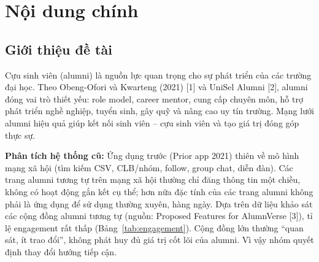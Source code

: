 \documentclass[12pt,a4paper]{article}
\begin{document}
\pagestyle{fancy}
\fancyhf{}
\rfoot{\textbf{\thepage}}

\setcounter{section}{1}
\section{Nội dung chính}
\subsection{Giới thiệu đề tài}

Cựu sinh viên (alumni) là nguồn lực quan trọng cho sự phát triển của các trường đại học. Theo Obeng-Ofori và Kwarteng (2021) [1] và UniSel Alumni [2], alumni đóng vai trò thiết yếu: role model, career mentor, cung cấp chuyên môn, hỗ trợ phát triển nghề nghiệp, tuyển sinh, gây quỹ và nâng cao uy tín trường. Mạng lưới alumni hiệu quả giúp kết nối sinh viên -- cựu sinh viên và tạo giá trị đóng góp thực sự.

\textbf{Phân tích hệ thống cũ:} Ứng dụng trước (Prior app 2021) thiên về mô hình mạng xã hội (tìm kiếm CSV, CLB/nhóm, follow, group chat, diễn đàn). Các trang alumni tương tự trên mạng xã hội thường chỉ đăng thông tin một chiều, không có hoạt động gắn kết cụ thể; hơn nữa đặc tính của các trang alumni không phải là ứng dụng để sử dụng thường xuyên, hàng ngày. Dựa trên dữ liệu khảo sát các cộng đồng alumni tương tự (nguồn: Proposed Features for AlumnVerse [3]), tỉ lệ engagement rất thấp (Bảng~\ref{tab:engagement}). Cộng đồng lớn thường ``quan sát, ít trao đổi'', không phát huy đủ giá trị cốt lõi của alumni. Vì vậy nhóm quyết định thay đổi hướng tiếp cận.

\begin{table}[H]
\centering
\caption{Phân tích tỉ lệ engagement của các trang alumni tương tự (nguồn: Proposed Features for AlumnVerse)}
\label{tab:engagement}
\small
{}
\end{table}
\end{document}
